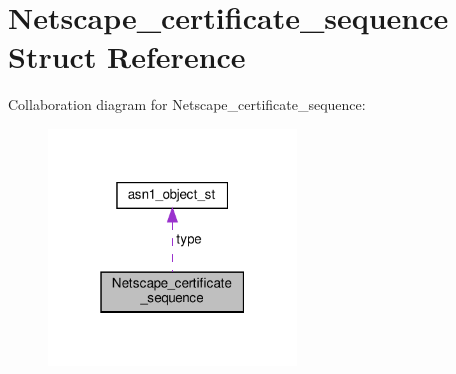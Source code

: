 \hypertarget{structNetscape__certificate__sequence}{}\section{Netscape\+\_\+certificate\+\_\+sequence Struct Reference}
\label{structNetscape__certificate__sequence}


Collaboration diagram for Netscape\+\_\+certificate\+\_\+sequence\+:
\nopagebreak
\begin{figure}[H]
\begin{center}
\leavevmode
\includegraphics[width=187pt]{structNetscape__certificate__sequence__coll__graph}
\end{center}
\end{figure}
